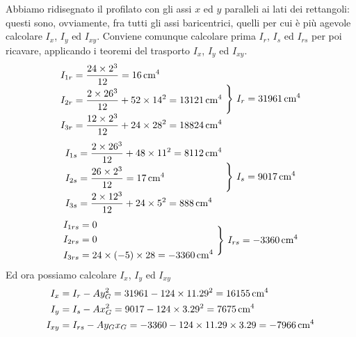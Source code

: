 \noindent Abbiamo ridisegnato il profilato con gli assi $x$ ed $y$ paralleli ai lati dei rettangoli: questi sono, ovviamente, fra tutti gli assi baricentrici, quelli per cui è più agevole calcolare $I_x$, $I_y$ ed $I_{xy}$. Conviene comunque calcolare prima $I_r$, $I_s$ ed $I_{rs}$ per poi ricavare, applicando i teoremi del trasporto $I_x$, $I_y$ ed $I_{xy}$.
\begin{equation*}
\begin{aligned}
I_{1r} &= \frac{24\times 2^3}{12} = 16\,\textup{cm}^4 \\
I_{2r} &= \frac{2\times 26^3}{12} + 52\times 14^2 = 13121\,\textup{cm}^4  \\
I_{3r} &= \frac{12\times 2^3}{12} + 24\times 28^2 = 18824\,\textup{cm}^4
\end{aligned}
\,\,\Biggr\}\,\, I_r = 31961\,\textup{cm}^4
\end{equation*}
\begin{equation*}
\begin{aligned}
I_{1s} &= \frac{2\times 26^3}{12} + 48\times 11^2 = 8112\,\textup{cm}^4 \\
I_{2s} &= \frac{26\times 2^3}{12} = 17\,\textup{cm}^4 \\
I_{3s} &= \frac{2\times 12^3}{12} + 24\times 5^2 = 888\,\textup{cm}^4
\end{aligned}
\,\,\Biggr\}\,\, I_s = 9017\,\textup{cm}^4
\end{equation*}
\begin{equation*}
\begin{aligned}
I_{1rs} &= 0 \\
I_{2rs} &= 0 \\
I_{3rs} &= 24\times(-5)\times 28 = -3360\,\textup{cm}^4
\end{aligned}
\,\,\Biggr\}\,\, I_{rs} = -3360\,\textup{cm}^4
\end{equation*}
Ed ora possiamo calcolare $I_x$, $I_y$ ed $I_{xy}$
\begin{align*}
I_{x} &= I_{r}-Ay_{G}^{2} = 31961-124\times 11.29^{2} = 16155\,\textup{cm}^4 \\
I_{y} &= I_{s}-Ax_{G}^{2} = 9017-124\times 3.29^{2} = 7675\,\textup{cm}^4  \\
I_{xy} &= I_{rs}-Ay_{G}x_{G} = -3360-124\times 11.29\times 3.29 = -7966\,\textup{cm}^4
\end{align*}
